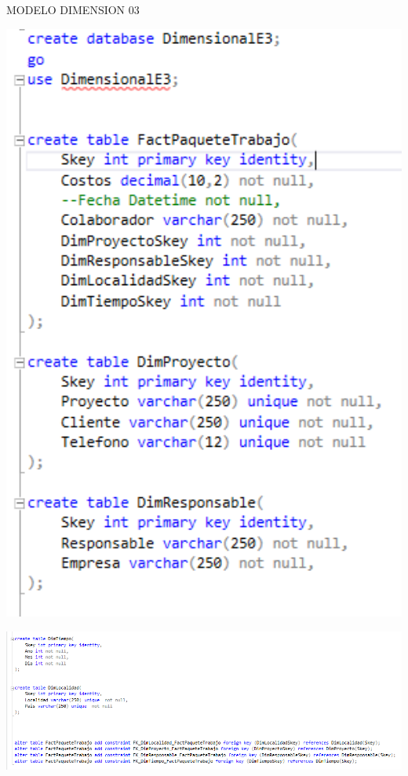 MODELO DIMENSION 03

	\begin{center}
	\includegraphics[width=17cm]{./Imagenes/33}
	\end{center}	

	\begin{center}
	\includegraphics[width=17cm]{./Imagenes/34}
	\end{center}	